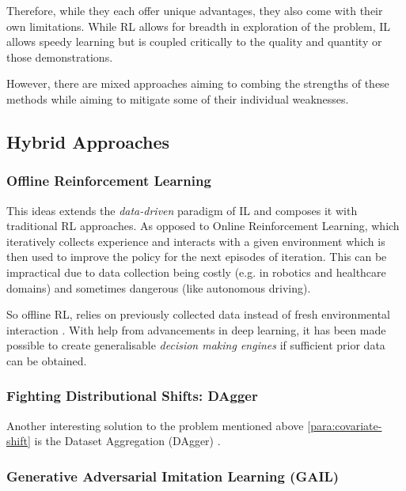 Therefore, while they each offer unique advantages, they also come with their own limitations. While RL allows for breadth in exploration of the problem, IL allows speedy learning but is coupled critically to the quality and quantity or those demonstrations. 

However, there are mixed approaches aiming to combing the strengths of these methods while aiming to mitigate some of their individual weaknesses.

\subsection{Hybrid Approaches}


\subsubsection{Offline Reinforcement Learning}
This ideas extends the \emph{data-driven} paradigm of IL and composes it with traditional RL approaches. As opposed to Online Reinforcement Learning, which iteratively collects experience and interacts with a given environment which is then used to improve the policy for the next episodes of iteration. This can be impractical due to data collection being costly (e.g. in robotics and healthcare domains) and sometimes dangerous (like autonomous driving). 

So offline RL, relies on previously collected data instead of fresh environmental interaction \cite{levine2020offlinereinforcementlearningtutorial}. With help from advancements in deep learning, it has been made possible to create generalisable \emph{decision making engines} \cite{levine2020offlinereinforcementlearningtutorial} if sufficient prior data can be obtained.

\subsubsection{Fighting Distributional Shifts: DAgger}
Another interesting solution to the problem mentioned above \ref{para:covariate-shift} is the Dataset Aggregation (DAgger) \cite{ross2011reductionimitationlearningstructured}. 

\subsubsection{Generative Adversarial Imitation Learning (GAIL)}
\label{subsubsec:gail}

